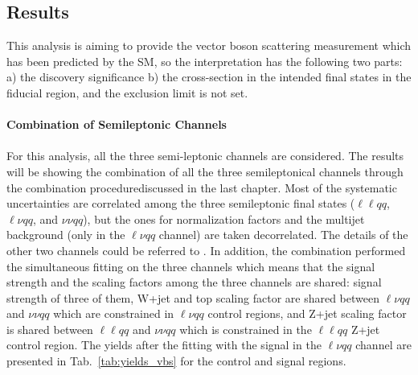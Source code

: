 \subsection{Results}
This analysis is aiming to provide the vector boson scattering measurement which has been predicted by the SM, so the interpretation has the following two parts: a) the discovery significance b) the cross-section in the intended final states in the fiducial region, and the exclusion limit is not set. 
\\
\\{\bf Combination of Semileptonic Channels}
\\
\\For this analysis, all the three semi-leptonic channels are considered. The results will be showing the combination of all the three semileptonical channels through the combination procedurediscussed in the last chapter. Most of the systematic uncertainties are correlated among the three semileptonic final states ($\ell\ell qq$, $\ell\nu qq$, and $\nu\nu qq$), but the ones for normalization factors and the multijet background (only in the $\ell\nu qq$ channel) are taken decorrelated. The details of the other two channels could be referred to \cite{Aad:2019xxo}. In addition, the combination performed the simultaneous fitting on the three channels which means that the signal strength and the scaling factors among the three channels are shared: signal strength of three of them, W+jet and top scaling factor are shared between $\ell\nu qq$ and $\nu\nu qq$ which are constrained in $\ell\nu qq$ control regions, and Z+jet scaling factor is shared between $\ell\ell qq$ and $\nu\nu qq$ which is constrained in the $\ell\ell qq$ Z+jet control region. The yields after the fitting with the signal in the $\ell\nu qq$ channel are presented in Tab.~\ref{tab:yields_vbs} for the control and signal regions. 


